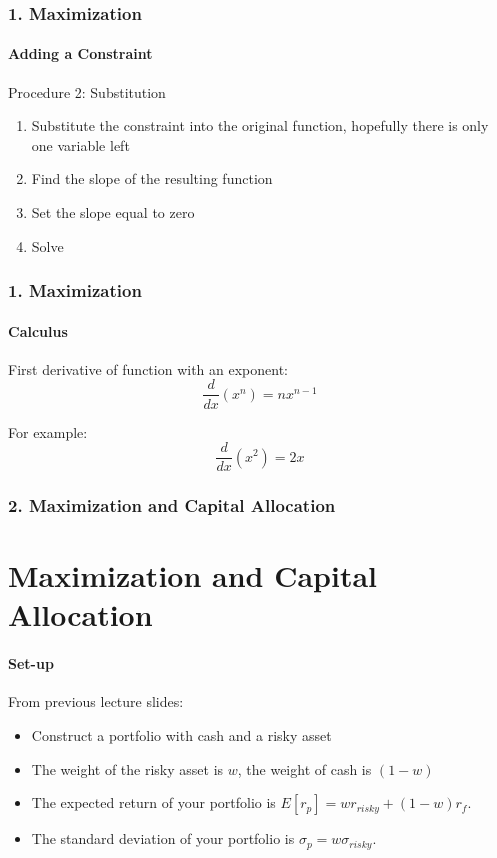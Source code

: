 \documentclass{beamer}
\begin{document}
\begin{foundframe}
    \frametitle{1. Maximization}
    \framesubtitle{Adding a Constraint}    

    Procedure 2: Substitution
    \begin{enumerate}
    \item Substitute the constraint into the original function, hopefully there is only one variable left
    \item Find the slope of the resulting function 
    \item Set the slope equal to zero
    \item Solve
    \end{enumerate}

\end{foundframe}

\begin{foundframe}
    \frametitle{1. Maximization}
    \framesubtitle{Calculus}    

    First derivative of function with an exponent:
    $$\frac{d}{dx}(x^n) = nx^{n-1}$$

    For example:
    $$\frac{d}{dx}(x^2) = 2x$$

\end{foundframe}

\begin{frame}[t]
    \frametitle{2. Maximization and Capital Allocation}
    \section{Maximization and Capital Allocation}
    \framesubtitle{Set-up}

    From previous lecture slides:
    \begin{itemize}
    \item Construct a portfolio with cash and a risky asset
    \item The weight of the risky asset is $w$, the weight of cash is $(1-w)$
    \item The expected return of your portfolio is $E[r_p] = wr_{risky} + (1-w)r_f$.   
    \item The standard deviation of your portfolio is $\sigma_p = w\sigma_{risky}$.   
    \vspace{1em}
    \end{itemize}

\end{frame}
\end{document}
